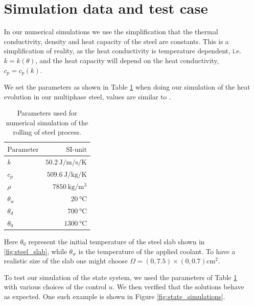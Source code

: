 \section{Simulation data and test case}

In our numerical simulations we use the simplification that the thermal conductivity, density and heat capacity of the steel are constants. This is a simplification of reality, as the heat conductivity is temperature dependent, i.e. $k = k(\theta)$, and the heat capacity will depend on the heat conductivity, $c_p = c_p(k)$.


We set the parameters as shown in Table \ref{tab:chosenParam} when doing our simulation of the heat evolution in our multiphase steel, values are similar to \cite{DPSteel}. 
\begin{table}[h]
    \centering
    \caption{Parameters used for numerical simulation of the rolling of steel process.}
    \begin{tabular}{@{}lr@{}} \toprule
    $\text{Parameter}$ & $\text{SI-unit}$ \\
    \midrule
       $k$& $\SI{50.2}{\joule\per\metre\per\second\per\kelvin}$ \\
        $c_p$ & $\SI{509.6}{\joule\per\kilogram\per\kelvin}$ \\
        $\rho$ & $\SI{7850}{\kilogram\per\metre\cubed}$ \\
        $\theta_w$ & $\SI{20}{\celsius}$ \\
        $\theta_d$ & $\SI{700}{\celsius}$ \\
        $\theta_0$ & $\SI{1300}{\celsius}$ \\ \bottomrule
    \end{tabular}
    \label{tab:chosenParam}
\end{table}
Here $\theta_0$ represent the initial temperature of the steel slab shown in \ref{fig:steel_slab}, while $\theta_w$ is the temperature of the applied coolant. To have a realistic size of the slab one might choose $\Omega = (0,7.5)\times(0,0.7) \text{cm}^2$.

To test our simulation of the state system, we used the parameters of Table \ref{tab:chosenParam} with various choices of the control $u$. We then verified that the solutions behave as expected. One such example is shown in Figure \ref{fig:state_simulations}.

